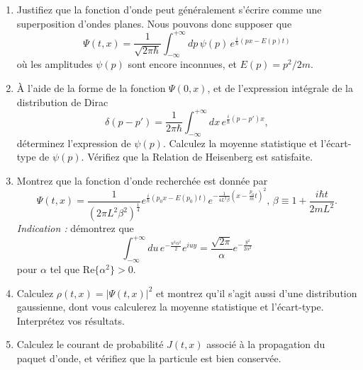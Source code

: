 \begin{enumerate}
\item Justifiez que la fonction d'onde peut généralement s'écrire comme une superposition d'ondes planes. Nous pouvons donc supposer que
\begin{equation}
\Psi(t,x) = \frac{1}{\sqrt{2\pi\hbar}} \int_{-\infty}^{+\infty} dp \, \psi(p) \, e^{\frac{i}{\hbar} (px - E(p) t)} 
\end{equation}
où les amplitudes $\psi(p)$ sont encore inconnues, et $E(p) = p^2/2m$. 
\item À l'aide de la forme de la fonction $\Psi(0,x)$, et de l'expression intégrale de la distribution de Dirac
\begin{equation}
\delta(p-p') = \frac{1}{2\pi\hbar} \int_{-\infty}^{+\infty} dx \, e^{\frac{i}{\hbar} (p-p')x},
\end{equation}
déterminez l'expression de $\psi(p)$. Calculez la moyenne statistique et l'écart-type de $\psi(p)$. Vérifiez que la Relation de Heisenberg est satisfaite.
\item Montrez que la fonction d'onde recherchée est donnée par
\begin{equation}
\Psi(t,x) = \frac{1}{(2\pi L^2 \beta^2)^{\frac{1}{4}} } e^{\frac{i}{\hbar}(p_0 x - E(p_0)t)} e^{-\frac{1}{4L^2\beta} (x - \frac{p_0}{m}t)^2}, \, \beta \equiv 1 + \frac{i\hbar t}{2mL^2}.
\end{equation}
\textit{Indication :} démontrez que
\begin{equation}
\int_{-\infty}^{+\infty} du \, e^{-\frac{u^2\alpha^2}{2}} e^{iuy} = \frac{\sqrt{2\pi}}{\alpha} e^{-\frac{y^2}{2\alpha^2}}
\end{equation}
pour $\alpha$ tel que $\text{Re}\lbrace \alpha^2\rbrace > 0$.
\item Calculez $\rho(t,x) = |\Psi(t,x)|^2$ et montrez qu'il s'agit aussi d'une distribution gaussienne, dont vous calculerez la moyenne statistique et l'écart-type. Interprétez vos résultats.
\item Calculez le courant de probabilité $J(t,x)$ associé à la propagation du paquet d'onde, et vérifiez que la particule est bien conservée.
\end{enumerate}

\newpage
